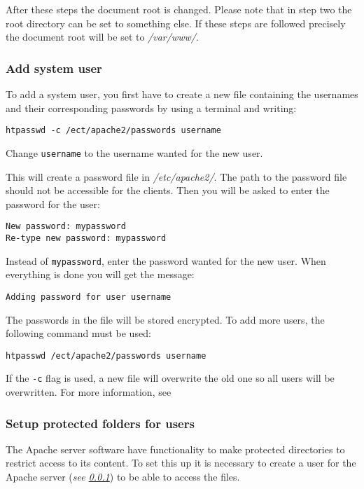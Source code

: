 After these steps the document root is changed. Please note that in step two the root directory can be set 
to something else. If these steps are followed precisely the document root will be set to \textit{/var/www/}.

\subsubsection{Add system user}\label{sec:exp_d_passw}
To add a system user, you first have to create a new file containing the usernames and their corresponding passwords
by using a terminal and writing:
\begin{verbatim}htpasswd -c /ect/apache2/passwords username\end{verbatim}
Change \texttt{username} to the username wanted for the new user.

This will create a password file in \textit{/etc/apache2/}. 
The path to the password file should not be accessible for the clients. 
Then you will be asked to enter the password for the user:
\begin{verbatim}
New password: mypassword
Re-type new password: mypassword
\end{verbatim}

Instead of \texttt{mypassword}, enter the password wanted for the new user.
When everything is done you will get the message:
\begin{verbatim}Adding password for user username\end{verbatim}
The passwords in the file will be stored encrypted. To add more users, the following command must be used: 
\begin{verbatim}htpasswd /ect/apache2/passwords username\end{verbatim}
If the \texttt{-c} flag is used, a new file will overwrite the old one so all users will be overwritten. For more information, see \cite{exp_apache2user} 

\subsubsection{Setup protected folders for users}\label{sec:exp_d_protected}
The Apache server software have functionality to make protected directories to restrict access to its content. To set this 
up it is necessary to create a user for the Apache server (\textit{see \ref{sec:exp_d_passw}}) to be able to access the files. 

